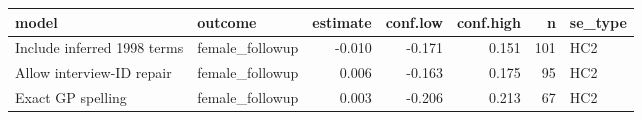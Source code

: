 
\begin{tabular}{llrrrrl}
\toprule
model & outcome & estimate & conf.low & conf.high & n & se\_type\\
\midrule
Include inferred 1998 terms & female\_followup & -0.010 & -0.171 & 0.151 & 101 & HC2\\
Allow interview-ID repair & female\_followup & 0.006 & -0.163 & 0.175 & 95 & HC2\\
Exact GP spelling & female\_followup & 0.003 & -0.206 & 0.213 & 67 & HC2\\
\bottomrule
\end{tabular}
